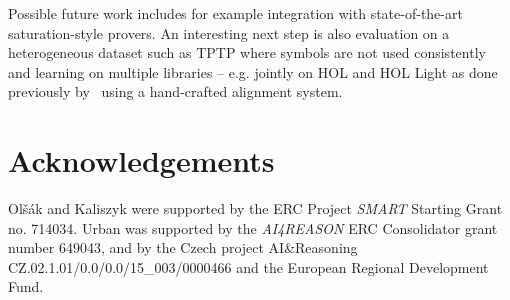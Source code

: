 \documentclass{ecai}
\newcommand{\nbc}[3]{
                {\colorbox{#3}{\bfseries\sffamily\scriptsize\textcolor{white}{#1}}}
                {\textcolor{#3}{\sffamily\small$\blacktriangleright$\textit{#2}$\blacktriangleleft$}}
}
\newcommand{\todo}[1]{\nbc{TODO}{#1}{todocolor}}
\begin{document}
Possible future work includes for example %
integration with state-of-the-art saturation-style provers. 
An interesting next step is also evaluation on a heterogeneous dataset such as TPTP where
symbols are not used consistently and learning on multiple libraries --
e.g. jointly on HOL and HOL Light as done previously
by~\cite{DBLP:conf/lpar/GauthierK15} using a hand-crafted alignment
system.

\section{Acknowledgements}
Ol\v{s}\'{a}k and Kaliszyk were supported by the ERC Project \emph{SMART} Starting Grant no. 714034.
Urban was supported by the \textit{AI4REASON} ERC
Consolidator grant number 649043, and by the Czech project
AI\&Reasoning CZ.02.1.01/0.0/0.0/15\_003/0000466 and the European
Regional Development Fund.


%
\end{document}
